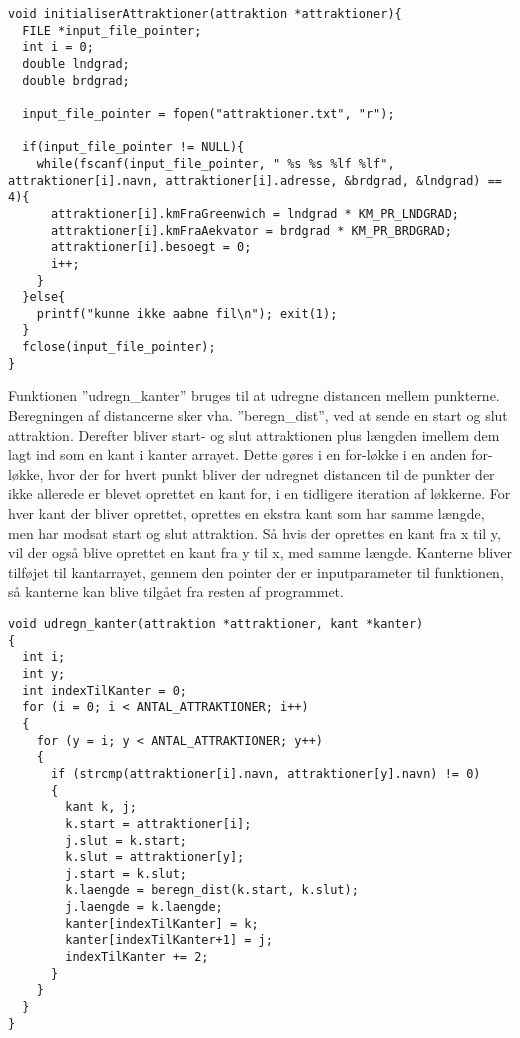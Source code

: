\begin{lstlisting}
void initialiserAttraktioner(attraktion *attraktioner){
  FILE *input_file_pointer;
  int i = 0;
  double lndgrad;
  double brdgrad;

  input_file_pointer = fopen("attraktioner.txt", "r");

  if(input_file_pointer != NULL){
    while(fscanf(input_file_pointer, " %s %s %lf %lf", attraktioner[i].navn, attraktioner[i].adresse, &brdgrad, &lndgrad) == 4){
      attraktioner[i].kmFraGreenwich = lndgrad * KM_PR_LNDGRAD;
      attraktioner[i].kmFraAekvator = brdgrad * KM_PR_BRDGRAD;
      attraktioner[i].besoegt = 0;
      i++;
    }
  }else{
    printf("kunne ikke aabne fil\n"); exit(1);
  }
  fclose(input_file_pointer);
}  
\end{lstlisting}

Funktionen ”udregn\_kanter” bruges til at udregne distancen mellem punkterne. Beregningen af distancerne sker vha. ”beregn\_dist”, ved at sende en start og slut attraktion. Derefter bliver start- og slut attraktionen plus længden imellem dem lagt ind som en kant i kanter arrayet. Dette gøres i en for-løkke i en anden for-løkke, hvor der for hvert punkt bliver der udregnet distancen til de punkter der ikke allerede er blevet oprettet en kant for, i en tidligere iteration af løkkerne. For hver kant der bliver oprettet, oprettes en ekstra kant som har samme længde, men har modsat start og slut attraktion. Så hvis der oprettes en kant fra x til y, vil der også blive oprettet en kant fra y til x, med samme længde. Kanterne bliver tilføjet til kantarrayet, gennem den pointer der er inputparameter til funktionen, så kanterne kan blive tilgået fra resten af programmet. \newline

\begin{lstlisting}
void udregn_kanter(attraktion *attraktioner, kant *kanter)
{
  int i;
  int y;
  int indexTilKanter = 0;
  for (i = 0; i < ANTAL_ATTRAKTIONER; i++)
  {
    for (y = i; y < ANTAL_ATTRAKTIONER; y++)
    {
      if (strcmp(attraktioner[i].navn, attraktioner[y].navn) != 0)
      {
        kant k, j;
        k.start = attraktioner[i];
        j.slut = k.start;
        k.slut = attraktioner[y];
        j.start = k.slut;
        k.laengde = beregn_dist(k.start, k.slut);
        j.laengde = k.laengde;
        kanter[indexTilKanter] = k;
        kanter[indexTilKanter+1] = j;
        indexTilKanter += 2;
      }
    }
  }
}
\end{lstlisting}

